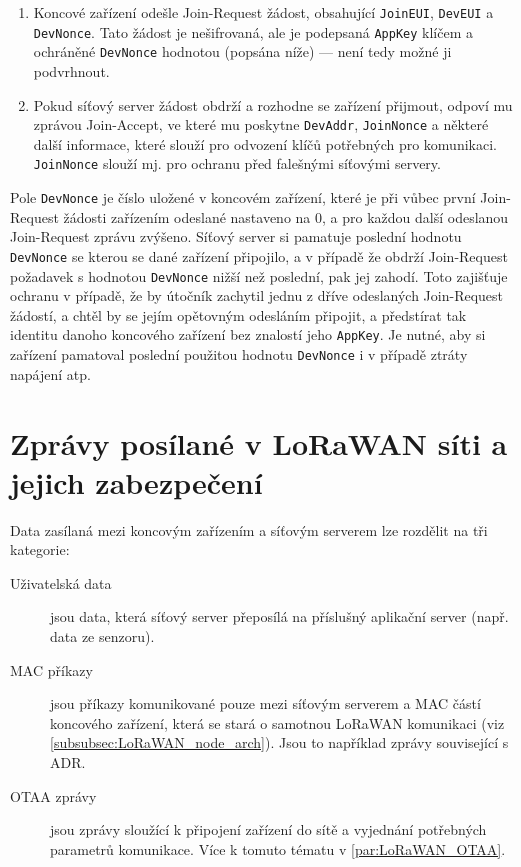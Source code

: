         \begin{enumerate}
            \item Koncové zařízení odešle Join-Request žádost, obsahující 
                \texttt{JoinEUI}, \texttt{DevEUI} a \texttt{DevNonce}. 
                Tato žádost je nešifrovaná, ale je podepsaná \texttt{AppKey} 
                klíčem a ochráněné \texttt{DevNonce} hodnotou (popsána níže)
                --- není tedy možné ji podvrhnout.
            \item Pokud síťový server žádost obdrží a rozhodne se zařízení 
                přijmout, odpoví mu zprávou Join-Accept, ve které mu poskytne
                \texttt{DevAddr}, \texttt{JoinNonce} a některé další informace,
                které slouží pro odvození klíčů potřebných pro komunikaci.
                \texttt{JoinNonce} slouží mj. pro ochranu před falešnými 
                síťovými servery.
        \end{enumerate}

        Pole \texttt{DevNonce} je číslo uložené v koncovém zařízení, které je 
        při vůbec první Join-Request žádosti zařízením odeslané nastaveno na 0,
        a pro každou další odeslanou Join-Request zprávu zvýšeno.
        Síťový server si pamatuje poslední hodnotu \texttt{DevNonce} se kterou
        se dané zařízení připojilo, a v případě že obdrží Join-Request požadavek
        s hodnotou \texttt{DevNonce} nižší než poslední, pak jej zahodí.
        Toto zajišťuje ochranu v případě, že by útočník zachytil jednu z
        dříve odeslaných Join-Request žádostí, a chtěl by se jejím opětovným 
        odesláním připojit, a předstírat tak identitu danoho koncového zařízení
        bez znalostí jeho \texttt{AppKey}.
        Je nutné, aby si zařízení pamatoval poslední použitou hodnotu 
        \texttt{DevNonce} i v případě ztráty napájení atp.

\section{Zprávy posílané v LoRaWAN síti a jejich zabezpečení}

    Data zasílaná mezi koncovým zařízením a síťovým serverem lze rozdělit na tři
    kategorie:

    \begin{description}
        \item [Uživatelská data] jsou data, která síťový server přeposílá na
            příslušný aplikační server (např. data ze senzoru).
        \item [MAC příkazy] jsou příkazy komunikované pouze mezi síťovým 
            serverem a MAC částí koncového zařízení, která se stará o samotnou
            LoRaWAN komunikaci (viz \ref{subsubsec:LoRaWAN_node_arch}). 
            Jsou to například zprávy související s ADR.
        \item [OTAA zprávy] jsou zprávy sloužící k připojení zařízení do sítě
            a vyjednání potřebných parametrů komunikace. Více k tomuto tématu
            v \ref{par:LoRaWAN_OTAA}.
    \end{description}

